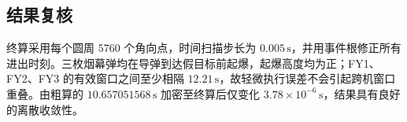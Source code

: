 \subsection{结果复核}

终算采用每个圆周 $5760$ 个角向点，时间扫描步长为 $0.005\,\mathrm{s}$，并用事件根修正所有进出时刻。三枚烟幕弹均在导弹到达假目标前起爆，起爆高度均为正；FY1、FY2、FY3 的有效窗口之间至少相隔 $12.21\,\mathrm{s}$，故轻微执行误差不会引起跨机窗口重叠。由粗算的 $10.657051568\,\mathrm{s}$ 加密至终算后仅变化 $3.78\times10^{-6}\,\mathrm{s}$，结果具有良好的离散收敛性。

\endinput
\section{问题四模型建立和求解}

参考文献对一篇正式论文来说是必不可少的，在建模中重要的参考文献当然应该列出。\LaTeX{}在这方面的功能也是十分强大的，下面介绍一个比较简单的参考文献制作方法。有兴趣的可学习 \verb|bibtex| 或 \verb|biblatex| 的使用。

\LaTeX{}的入门书籍可以看《\LaTeX{}入门》\cite{liuhaiyang2013latex}。这是一个简单的引用，用 \verb|\cite{bibkey}| 来完成。

本模板还提供了 \verb|\upcite{bibkey}| 和 \verb|\supercite{bibkey}| 命令用来引用，渲染效果是上标。
